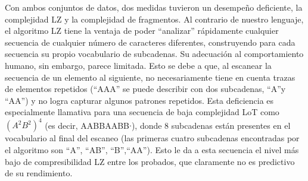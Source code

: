 
Con ambos conjuntos de datos, dos medidas tuvieron un desempeño deficiente, la complejidad LZ y la complejidad de fragmentos. Al contrario de nuestro lenguaje, el algoritmo LZ tiene la ventaja de poder ``analizar'' rápidamente cualquier secuencia de cualquier número de caracteres diferentes, construyendo para cada secuencia su propio vocabulario de subcadenas. Su adecuación al comportamiento humano, sin embargo, parece limitada. Esto se debe a que, al escanear la secuencia de un elemento al siguiente, no necesariamente tiene en cuenta trazas de elementos repetidos (``AAA'' se puede describir con dos subcadenas, ``A''y ``AA'') y no logra capturar algunos patrones repetidos. Esta deficiencia es especialmente llamativa para una secuencia de baja complejidad LoT como $(A^2B^2)^4$ (es decir, AABBAABB$\cdot$), donde 8 subcadenas están presentes en el vocabulario al final del escaneo (las primeras cuatro subcadenas encontradas por el algoritmo son ``A'', ``AB'', ``B'',``AA''). Esto le da a esta secuencia el nivel más bajo de compresibilidad LZ entre los probados, que claramente no es predictivo de su rendimiento.

